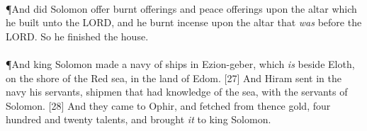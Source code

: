 \\
\P \textcolor[cmyk]{0.99998,1,0,0}{And  did Solomon offer burnt offerings and peace offerings upon the altar which he built unto the LORD, and he burnt incense upon the altar that \emph{was} before the LORD. So he finished the house.}\\
\\
\P \textcolor[cmyk]{0.99998,1,0,0}{And king Solomon made a navy of ships in Ezion-geber, which \emph{is} beside Eloth, on the shore of the Red sea, in the land of Edom.}
[27] \textcolor[cmyk]{0.99998,1,0,0}{And Hiram sent in the navy his servants, shipmen that had knowledge of the sea, with the servants of Solomon.}
[28] \textcolor[cmyk]{0.99998,1,0,0}{And they came to Ophir, and fetched from thence gold, four hundred and twenty talents, and brought \emph{it} to king Solomon.}
